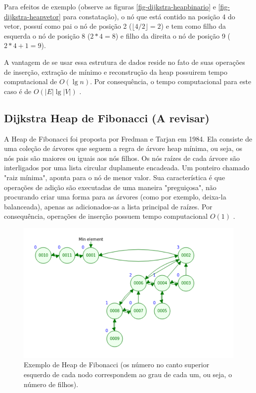  Para efeitos de exemplo (observe as figuras \ref{fig-dijkstra-heapbinario} e \ref{fig-dijkstra-heapvetor} para constatação), o nó que está contido na posição 4 do vetor, possuí como pai o nó de posição 2 ($\lfloor 4 / 2 \rfloor = 2$) e tem como filho da esquerda o nó de posição 8 ($2*4 = 8$) e filho da direita o nó de posição 9 ($2*4+1 = 9$).


A vantagem de se usar essa estrutura de dados reside no fato de suas operações de inserção, extração de mínimo e reconstrução da heap possuirem tempo computacional de $O(\lg n)$. Por consequência, o tempo computacional para este caso é de $O(|E| \lg |V|)$ \cite{cormen2009introduction}.

\subsection{Dijkstra Heap de Fibonacci (A revisar)}
\label{sec-dijkstra-versoes-fibonacci}
A Heap de Fibonacci foi proposta por Fredman e Tarjan em 1984. Ela consiste de uma coleção de árvores que seguem a regra de árvore heap mínima, ou seja, os nós pais são maiores ou iguais aos nós filhos. Os nós raízes de cada árvore são interligados por uma lista circular duplamente encadeada. Um ponteiro chamado "raiz mínima", aponta para o nó de menor valor. Sua característica é que operações de adição são executadas de uma maneira "preguiçosa", não procurando criar uma forma para as árvores (como por exemplo, deixa-la balanceada), apenas as adicionados-as a lista principal de raízes. Por consequência, operações de inserção possuem tempo computacional $O(1)$ \cite{cormen2009introduction}.

\begin{figure}[H]
\centering
\includegraphics[width=.75\textwidth]{figuras/fibonacci-heap1} 
\caption{Exemplo de Heap de Fibonacci (os número no canto superior esquerdo de cada nodo correspondem ao grau de cada um, ou seja, o número de filhos).}
\label{fig-dijkstra-heapfibonacci1}
\end{figure}

